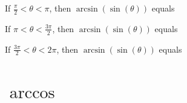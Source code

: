 \documentclass{ximera}
\begin{document}
\begin{question}


If $\frac{\pi}{2} < \theta < \pi$, then $\arcsin(\sin(\theta))$ equals

\begin{multipleChoice}
\choice {$\theta$}
\choice[correct] {$\pi - \theta$}
\choice {$\pi + \theta$}
\choice {$\theta - 2\pi$}
\end{multipleChoice}

\end{question}






\begin{question}


If $\pi < \theta < \frac{3\pi}{2}$, then $\arcsin(\sin(\theta))$ equals

\begin{multipleChoice}
\choice {$\theta$}
\choice[correct] {$\pi - \theta$}
\choice {$\pi + \theta$}
\choice {$\theta - 2\pi$}
\end{multipleChoice}

\end{question}






\begin{question}


If $\frac{3\pi}{2} < \theta < 2\pi$, then $\arcsin(\sin(\theta))$ equals

\begin{multipleChoice}
\choice {$\theta$}
\choice {$\pi - \theta$}
\choice {$\pi + \theta$}
\choice[correct] {$\theta - 2\pi$}
\end{multipleChoice}

\end{question}


























\section*{$\arccos$}
\end{document}
